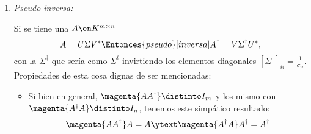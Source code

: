 \begin{enumerate}[label=\tiny\purple{\faIcon{snowman}}]
  \item \textit{Pseudo-inversa:}

        Si se tiene una $A \en K^{m \times n}$
        $$
          A = U \Sigma V^*
          \Entonces{pseudo}[inversa]
          A^\dagger = V \Sigma^\dagger U^*,
        $$
        con la $\Sigma^\dagger$ que sería como $\Sigma^t$ invirtiendo los elementos diagonales $[\Sigma^\dagger]_{ii} = \frac{1}{\sigma_{ii}}$.
        Propiedades de esta cosa dignas de ser mencionadas:
        \begin{itemize}
          \item Si bien en general, $\magenta{A A^\dagger} \distinto I_m$
                y los mismo con $\magenta{A^\dagger A} \distinto I_n$, tenemos este simpático resultado:
                $$
                  \magenta{A A^\dagger} A = A
                  \ytext
                  \magenta{A^\dagger A} A^\dagger = A^\dagger
                $$

        \end{itemize}
\end{enumerate}
